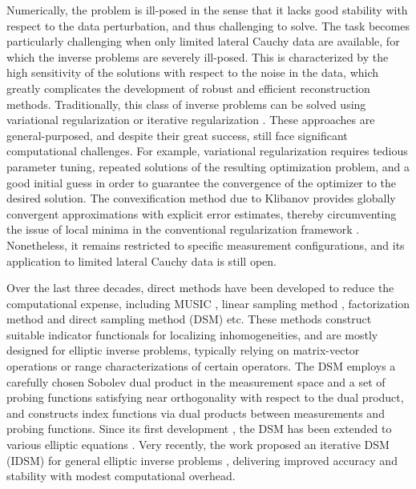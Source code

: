 \documentclass[onefignum,onetabnum]{siamart190516}
\numberwithin{equation}{section}
\begin{document}
Numerically, the problem is ill-posed in the sense that it lacks good stability with respect to the data perturbation, and thus challenging to solve.
The task becomes particularly challenging when only limited lateral Cauchy data are available, for which the inverse problems are severely ill-posed.
This is characterized by the high sensitivity of the solutions with respect to the noise in the data, which greatly complicates the development of robust and efficient reconstruction methods.
Traditionally, this class of inverse problems can be solved using variational regularization \cite{EnglHankeNeubauer:1996,ItoJin:2014} or iterative regularization \cite{Kaltenbacher2008}.
These approaches are general-purposed, and despite their great success, still face significant computational challenges.
For example, variational regularization requires tedious parameter tuning, repeated solutions of the resulting optimization problem, and a good initial guess in order to guarantee the convergence of the optimizer to the desired solution.
The convexification method due to Klibanov \cite{Klibanov:1997} provides globally convergent approximations with explicit error estimates, thereby circumventing the issue of local minima in the conventional regularization framework \cite{BeilinaKlibanov:2008,WenlongZhang:2020}.
Nonetheless, it remains restricted to specific measurement configurations, and its application to limited lateral Cauchy data is still open.

Over the last three decades, direct methods have been developed to reduce the computational expense, including  MUSIC \cite{Gruber2004}, linear sampling method \cite{Kirsch1996}, factorization method \cite{Kirsch1998} and direct sampling method (DSM) \cite{ItoJinZou:2012} etc.
These methods construct suitable indicator functionals for localizing inhomogeneities, and are mostly designed for elliptic inverse problems, typically relying on matrix-vector operations or range characterizations of certain operators.
The DSM employs a carefully chosen Sobolev dual product in the measurement space and a set of probing functions satisfying near orthogonality with respect to the dual product, and constructs index functions via dual products between measurements and probing functions. Since its first development \cite{ItoJinZou:2012}, the DSM has been extended to various elliptic equations \cite{ItoJinZou:2013,Zou2014,Zou2015,Zou2021}.
Very recently, the work \cite{Ito2025Iterative} proposed an iterative DSM (IDSM) for general elliptic inverse problems \cite{Ito2025Iterative}, delivering improved accuracy and stability with modest computational overhead.
\end{document}
